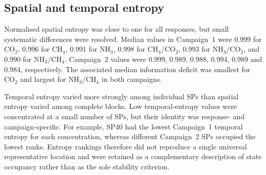 \documentclass[12pt,a4paper]{article}
\begin{document}
\begin{table}[htbp]
\centering
\caption{Three SPs with the smallest median absolute relative error against the contemporaneous leave-one-out network median. Values in parentheses are median absolute errors (\%).}
\label{tab:representative-sp}
\small
{}
\end{table}

\subsection{Spatial and temporal entropy}

Normalised spatial entropy was close to one for all responses, but small systematic differences were resolved. Median values in Campaign~1 were 0.999 for \(\mathrm{CO_2}\), 0.996 for \(\mathrm{CH_4}\), 0.991 for \(\mathrm{NH_3}\), 0.998 for \(\mathrm{CH_4}/\mathrm{CO_2}\), 0.993 for \(\mathrm{NH_3}/\mathrm{CO_2}\), and 0.990 for \(\mathrm{NH_3}/\mathrm{CH_4}\). Campaign~2 values were 0.999, 0.989, 0.988, 0.994, 0.989 and 0.984, respectively. The associated median information deficit was smallest for \(\mathrm{CO_2}\) and largest for \(\mathrm{NH_3}/\mathrm{CH_4}\) in both campaigns.

Temporal entropy varied more strongly among individual SPs than spatial entropy varied among complete blocks. Low temporal-entropy values were concentrated at a small number of SPs, but their identity was response- and campaign-specific. For example, SP40 had the lowest Campaign~1 temporal entropy for each concentration, whereas different Campaign~2 SPs occupied the lowest ranks. Entropy rankings therefore did not reproduce a single universal representative location and were retained as a complementary description of state occupancy rather than as the sole stability criterion.
\end{document}
